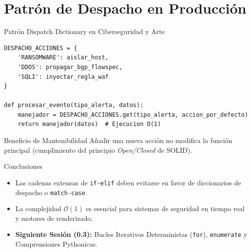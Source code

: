 \documentclass[aspectratio=169]{beamer}
\begin{document}
\section{Patrón de Despacho en Producción}

\begin{frame}[fragile]{Patrón Dispatch Dictionary en Ciberseguridad y Arte}
\begin{lstlisting}
DESPACHO_ACCIONES = {
    'RANSOMWARE': aislar_host,
    'DDOS': propagar_bgp_flowspec,
    'SQLI': inyectar_regla_waf
}

def procesar_evento(tipo_alerta, datos):
    manejador = DESPACHO_ACCIONES.get(tipo_alerta, accion_por_defecto)
    return manejador(datos)  # Ejecucion O(1)
\end{lstlisting}
\begin{block}{Beneficio de Mantenibilidad}
    Añadir una nueva acción no modifica la función principal (cumplimiento del principio \textit{Open/Closed} de SOLID).
\end{block}
\end{frame}

\begin{frame}{Conclusiones}
    \begin{itemize}
        \item Las cadenas extensas de \texttt{if-elif} deben evitarse en favor de diccionarios de despacho o \texttt{match-case}.
        \item La complejidad $\mathcal{O}(1)$ es esencial para sistemas de seguridad en tiempo real y motores de renderizado.
        \item \textbf{Siguiente Sesión (0.3):} Bucles Iterativos Deterministas (\texttt{for}), \texttt{enumerate} y Comprensiones Pythonicas.
    \end{itemize}
\end{frame}
\end{document}
